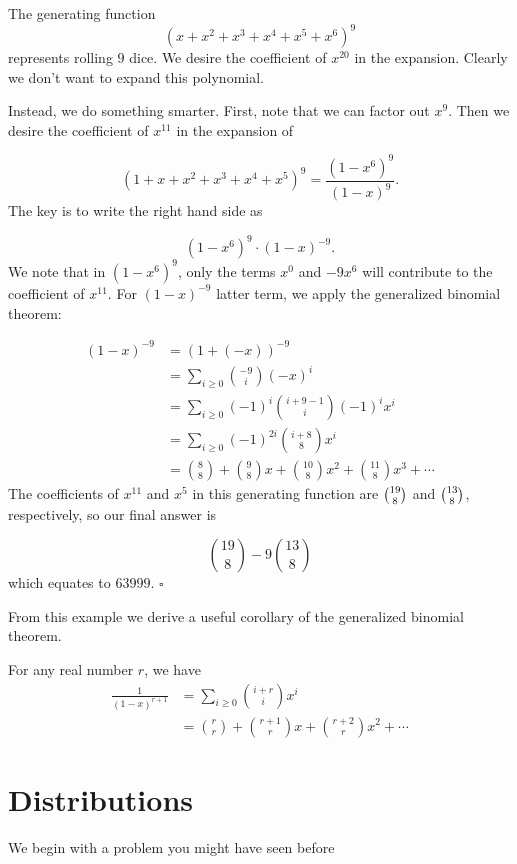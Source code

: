 \documentclass{article}
\begin{document}
\begin{sol}
The generating function \[(x+x^2+x^3+x^4+x^5+x^6)^{9}\] represents rolling $9$ dice. We desire the coefficient of $x^{20}$ in the expansion. Clearly we don't want to expand this polynomial. %

Instead, we do something smarter. First, note that we can factor out $x^9$. Then we desire the coefficient of $x^{11}$ in the expansion of

\[(1+x+x^2+x^3+x^4+x^5)^{9} = \frac{(1-x^6)^9}{(1-x)^9}.\]
The key is to write the right hand side as

\[(1-x^6)^9 \cdot (1-x)^{-9}.\]
We note that in $(1-x^6)^9$, only the terms $x^0$ and $-9x^6$ will contribute to the coefficient of $x^{11}$. For $(1-x)^{-9}$ latter term, we apply the generalized binomial theorem:

\begin{align*}
(1-x)^{-9} & = (1 + (-x))^{-9}\\
& = \sum_{i \ge 0} \binom{-9}{i} (-x)^i\\
& = \sum_{i \ge 0} (-1)^i\binom{i+9-1}{i} (-1)^ix^i\\
& = \sum_{i \ge 0} (-1)^{2i} \binom{i+8}{8} x^i\\
& = \binom{8}{8} + \binom{9}{8}x + \binom{10}{8}x^2 + \binom{11}{8}x^3 + \cdots 
\end{align*}
The coefficients of $x^{11}$ and $x^5$ in this generating function are $\tbinom{19}{8}$ and $\tbinom{13}{8}$, respectively, so our final answer is

\[\binom{19}{8} - 9\binom{13}{8}\]
which equates to $63999$. $\square$
\end{sol} 
\bigskip

From this example we derive a useful corollary of the generalized binomial theorem.

\begin{corollary}
For any real number $r$, we have
\begin{align*}
\frac{1}{(1-x)^{r+1}} & = \sum_{i\ge 0} \binom{i+r}{i}x^i\\
& = \binom{r}{r} + \binom{r+1}{r}x + \binom{r+2}{r}x^2 + \cdots
\end{align*}
\end{corollary}

\section{Distributions}
We begin with a problem you might have seen before
\end{document}
